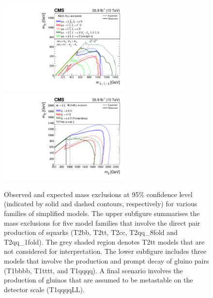 \begin{figure}%
\centering
\includegraphics[width=0.6\textwidth]{figs/results/squarkSUMMARY.pdf}\\
\includegraphics[width=0.6\textwidth]{figs/results/gluinoAllSUMMARY.pdf}\\
\caption{Observed and expected mass exclusions at 95\% confidence level 		
(indicated by solid and dashed contours, respectively) for various families of 
simplified models. The upper subfigure summarises the mass exclusions for five 
model families that involve the direct pair production of squarks (T2bb, T2tt, 
T2cc, T2qq\_8fold and T2qq\_1fold). The grey shaded region denotes T2tt models 
that are not considered for interpretation. The lower subfigure includes three 
models that involve the production and prompt decay of gluino pairs (T1bbbb, 
T1tttt, and T1qqqq). A final scenario involves the production of gluinos that 
are assumed to be metastable on the detector scale (T1qqqqLL).}
\label{fig:limits-sms} 
\end{figure}

